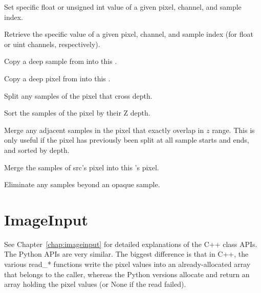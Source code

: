 Set specific float or unsigned int value of a given pixel, channel, and
sample index.
\apiend

Retrieve the specific value of a given pixel,
channel, and sample index (for float or uint channels, respectively).
\apiend

\NEW %
Copy a deep sample from  into this \DeepData.
\apiend

\NEW %
Copy a deep pixel from  into this \DeepData.
\apiend

\NEW %
Split any samples of the pixel that cross {\cf depth}.
\apiend

\NEW %
Sort the samples of the pixel by their Z depth.
\apiend

\NEW %
Merge any adjacent samples in the pixel that exactly overlap in $z$
range. This is only useful if the pixel has previously been split at
all sample starts and ends, and sorted by depth.
\apiend

\NEW %
Merge the samples of {\cf src}'s pixel into this \DeepData's pixel.
\apiend

\NEW %
Eliminate any samples beyond an opaque sample.
\apiend



\section{ImageInput}
\label{sec:pythonimageinput}

See Chapter~\ref{chap:imageinput} for detailed explanations of the
C++ \ImageInput class APIs. The Python APIs are very similar. The biggest
difference is that in C++, the various {\cf read_*} functions write the
pixel values into an already-allocated array that belongs to the caller,
whereas the Python versions allocate and return an array holding the pixel
values (or {\cf None} if the read failed).



